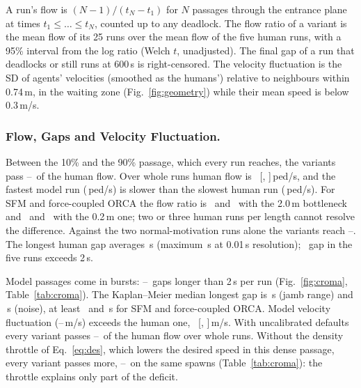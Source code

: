 A run's flow is $(N-1)/(t_N-t_1)$ for $N$ passages through the entrance plane at times $t_1\le\dots\le t_N$, counted up to any deadlock. The flow ratio of a variant is the mean flow of its 25 runs over the mean flow of the five human runs, with a 95\% interval from the log ratio (Welch $t$, unadjusted). The final gap of a run that deadlocks or still runs at 600\,s is right-censored. The velocity fluctuation is the SD of agents' velocities (smoothed as the humans') relative to neighbours within 0.74\,m, in the waiting zone (Fig.~\ref{fig:geometry}) while their mean speed is below 0.3\,m/s.

%
\subsubsection{Flow, Gaps and Velocity Fluctuation.}
Between the 10\% and the 90\% passage, which every run reaches, the variants pass \RvAnineWindowRatioMin--\RvAnineWindowRatioMax\ of the human flow. Over whole runs human flow is \PendHumanFlow\ [\PendHumanFlowLo, \PendHumanFlowHi]\,ped/s, and the fastest model run (\PendModelFlowMax\,ped/s) is slower than the slowest human run (\PendHumanFlowMin\,ped/s). For SFM and force-coupled ORCA the flow ratio is \RvAnineCOneLongRatio\ and \RvAnineCThreeLongRatio\ with the 2.0\,m bottleneck and \RvAnineCOneShortRatio\ and \RvAnineCThreeShortRatio\ with the 0.2\,m one; two or three human runs per length cannot resolve the difference. Against the two normal-motivation runs alone the variants reach \RvAnineCSigNormalRatio--\RvAnineCThreeNormalRatio. The longest human gap averages \EtenHumanGap\,s (maximum \EtenHumanGapMax\,s at 0.01\,s resolution); \EtenHumanGapsOverTwoTotal\ gap in the five runs exceeds 2\,s.

Model passages come in bursts: \PendCThreeGapsTwo--\PendSigGapsTwo\ gaps longer than 2\,s per run (Fig.~\ref{fig:croma}, Table~\ref{tab:croma}). The Kaplan--Meier median longest gap is \RevDThreeCEdgeGapKMMedian\,s (jamb range) and \PendSigGapKMMedian\,s (noise), at least \PendCOneGapLowerMedianTwo\ and \PendCThreeGapLowerMedianTwo\,s for SFM and force-coupled ORCA. Model velocity fluctuation (\RevDThreeCOneFluct--\RevDThreeCSigFluct\,m/s) exceeds the human one, \EtenHumanFluct\ [\EtenHumanFluctLo, \EtenHumanFluctHi]\,m/s.
With uncalibrated defaults every variant passes \RevDThreeRatioMin--\RevDThreeRatioMax\ of the human flow over whole runs.
Without the density throttle of Eq.~\eqref{eq:des}, which lowers the desired speed in this dense passage, every variant passes more, \RvBoneCroOffMin--\RvBoneCroOffMax\ on the same spawns (Table~\ref{tab:croma}): the throttle explains only part of the deficit.
